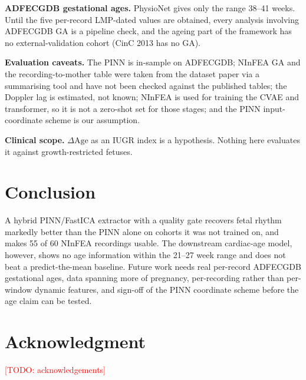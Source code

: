 \documentclass[journal]{IEEEtran}
\newcommand{\todo}[1]{\textcolor{red}{[TODO: #1]}}
\begin{document}
\textbf{ADFECGDB gestational ages.} PhysioNet gives only the range 38--41 weeks. Until the five per-record LMP-dated values are obtained, every analysis involving ADFECGDB GA is a pipeline check, and the ageing part of the framework has no external-validation cohort (CinC 2013 has no GA).

\textbf{Evaluation caveats.} The PINN is in-sample on ADFECGDB; NInFEA GA and the recording-to-mother table were taken from the dataset paper via a summarising tool and have not been checked against the published tables; the Doppler lag is estimated, not known; NInFEA is used for training the CVAE and transformer, so it is not a zero-shot set for those stages; and the PINN input-coordinate scheme is our assumption.

\textbf{Clinical scope.} $\Delta\mathrm{Age}$ as an IUGR index is a hypothesis. Nothing here evaluates it against growth-restricted fetuses.

\section{Conclusion}
A hybrid PINN/FastICA extractor with a quality gate recovers fetal rhythm markedly better than the PINN alone on cohorts it was not trained on, and makes 55 of 60 NInFEA recordings usable. The downstream cardiac-age model, however, shows no age information within the 21--27 week range and does not beat a predict-the-mean baseline. Future work needs real per-record ADFECGDB gestational ages, data spanning more of pregnancy, per-recording rather than per-window dynamic features, and sign-off of the PINN coordinate scheme before the age claim can be tested.

\section*{Acknowledgment}
\todo{acknowledgements}



\end{document}
